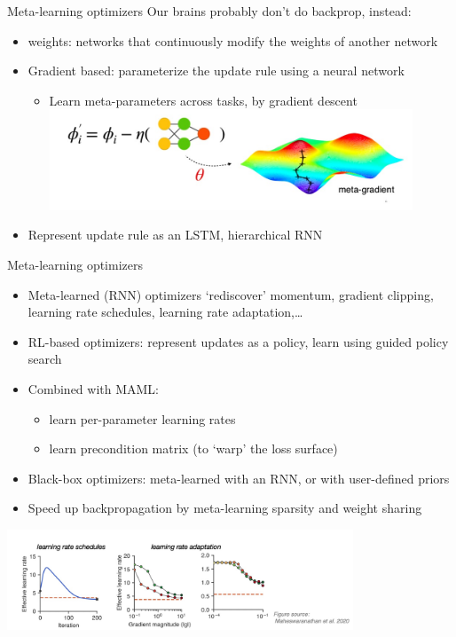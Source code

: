 \begin{frame}{Meta-learning optimizers}
    Our brains probably don’t do backprop, instead:
    \begin{itemize}
        \item weights: networks that continuously modify the weights of another network
        \item Gradient based: parameterize the update rule using a neural network
        \begin{itemize}
            \item Learn meta-parameters across tasks, by gradient descent
            \centering\includegraphics[height=3cm]{image/img011721.jpg}
        \end{itemize}
        \item Represent update rule as an LSTM, hierarchical RNN 
    \end{itemize}
\end{frame}
\begin{frame}{Meta-learning optimizers}
    \begin{itemize}
        \item Meta-learned (RNN) optimizers ‘rediscover’ momentum, gradient clipping, learning rate schedules, learning rate adaptation,… \\
        \item RL-based optimizers: represent updates as a policy, learn using guided policy search 
        \item Combined with MAML: 
        \begin{itemize}
            \item learn per-parameter learning rates
            \item learn precondition matrix (to `warp' the loss surface)
        \end{itemize}
        \item Black-box optimizers: meta-learned with an RNN, or with user-defined priors
        \item Speed up backpropagation by meta-learning sparsity and weight sharing 
    \end{itemize}
    \centering\includegraphics[height=3cm]{image/img012318.jpg}
\end{frame}
